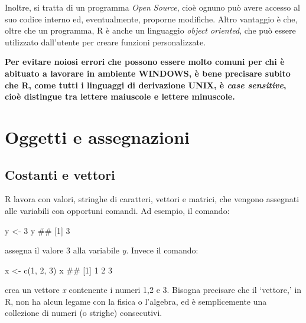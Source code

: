\documentclass[a4paper,12pt,oneside]{book}
\newenvironment{Shaded}{\begin{snugshade}}{\end{snugshade}}
\newcommand{\DecValTok}[1]{#1}
\newcommand{\DocumentationTok}[1]{#1}
\newcommand{\OtherTok}[1]{#1}
\newcommand{\FunctionTok}[1]{#1}
\newcommand{\NormalTok}[1]{#1}
\begin{document}
Inoltre, si tratta di un programma \emph{Open Source}, cioè ognuno può avere accesso al suo codice interno ed, eventualmente, proporne modifiche. Altro vantaggio è che, oltre che un programma, R è anche un linguaggio \emph{object oriented}, che può essere utilizzato dall'utente per creare funzioni personalizzate.

\textbf{Per evitare noiosi errori che possono essere molto comuni per chi è abituato a lavorare in ambiente WINDOWS, è bene precisare subito che R, come tutti i linguaggi di derivazione UNIX, è \emph{case sensitive}, cioè distingue tra lettere maiuscole e lettere minuscole.}

\hypertarget{oggetti-e-assegnazioni}{%
\section*{Oggetti e assegnazioni}\label{oggetti-e-assegnazioni}}

\hypertarget{costanti-e-vettori}{%
\subsection*{Costanti e vettori}\label{costanti-e-vettori}}

R lavora con valori, stringhe di caratteri, vettori e matrici, che vengono assegnati alle variabili con opportuni comandi. Ad esempio, il comando:

\begin{Shaded}
\begin{Highlighting}[]
\NormalTok{y  }\OtherTok{\textless{}{-}}  \DecValTok{3}
\NormalTok{y}
\DocumentationTok{\#\# [1] 3}
\end{Highlighting}
\end{Shaded}

assegna il valore 3 alla variabile \emph{y}. Invece il comando:

\begin{Shaded}
\begin{Highlighting}[]
\NormalTok{x  }\OtherTok{\textless{}{-}}  \FunctionTok{c}\NormalTok{(}\DecValTok{1}\NormalTok{, }\DecValTok{2}\NormalTok{, }\DecValTok{3}\NormalTok{)}
\NormalTok{x}
\DocumentationTok{\#\# [1] 1 2 3}
\end{Highlighting}
\end{Shaded}

crea un vettore \emph{x} contenente i numeri 1,2 e 3. Bisogna precisare che il `vettore,' in R, non ha alcun legame con la fisica o l'algebra, ed è semplicemente una collezione di numeri (o strighe) consecutivi.
\end{document}
